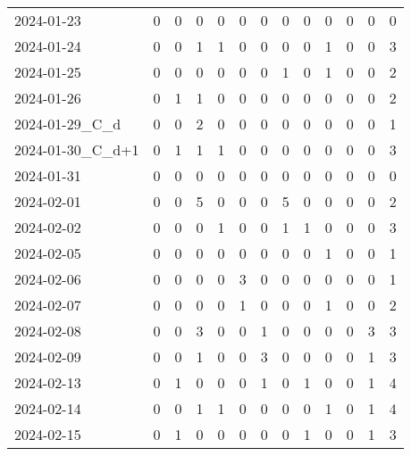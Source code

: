 \documentclass[dvipdfmx,oneside]{article}
\begin{document}
\begin{longtable}{lcccccccccccc}
        2024-01-23 &     0 &     0 &     0 &     0 &     0 &     0 &     0 &     0 &     0 &     0 &     0 &      0 \\
        2024-01-24 &     0 &     0 &     1 &     1 &     0 &     0 &     0 &     0 &     1 &     0 &     0 &      3 \\
        2024-01-25 &     0 &     0 &     0 &     0 &     0 &     0 &     1 &     0 &     1 &     0 &     0 &      2 \\
        2024-01-26 &     0 &     1 &     1 &     0 &     0 &     0 &     0 &     0 &     0 &     0 &     0 &      2 \\
  2024-01-29\_C\_d &     0 &     0 &     2 &     0 &     0 &     0 &     0 &     0 &     0 &     0 &     0 &      1 \\
2024-01-30\_C\_d+1 &     0 &     1 &     1 &     1 &     0 &     0 &     0 &     0 &     0 &     0 &     0 &      3 \\
        2024-01-31 &     0 &     0 &     0 &     0 &     0 &     0 &     0 &     0 &     0 &     0 &     0 &      0 \\
        2024-02-01 &     0 &     0 &     5 &     0 &     0 &     0 &     5 &     0 &     0 &     0 &     0 &      2 \\
        2024-02-02 &     0 &     0 &     0 &     1 &     0 &     0 &     1 &     1 &     0 &     0 &     0 &      3 \\
        2024-02-05 &     0 &     0 &     0 &     0 &     0 &     0 &     0 &     0 &     1 &     0 &     0 &      1 \\
        2024-02-06 &     0 &     0 &     0 &     0 &     3 &     0 &     0 &     0 &     0 &     0 &     0 &      1 \\
        2024-02-07 &     0 &     0 &     0 &     0 &     1 &     0 &     0 &     0 &     1 &     0 &     0 &      2 \\
        2024-02-08 &     0 &     0 &     3 &     0 &     0 &     1 &     0 &     0 &     0 &     0 &     3 &      3 \\
        2024-02-09 &     0 &     0 &     1 &     0 &     0 &     3 &     0 &     0 &     0 &     0 &     1 &      3 \\
        2024-02-13 &     0 &     1 &     0 &     0 &     0 &     1 &     0 &     1 &     0 &     0 &     1 &      4 \\
        2024-02-14 &     0 &     0 &     1 &     1 &     0 &     0 &     0 &     0 &     1 &     0 &     1 &      4 \\
        2024-02-15 &     0 &     1 &     0 &     0 &     0 &     0 &     0 &     1 &     0 &     0 &     1 &      3 \\

\end{longtable}
\end{document}

